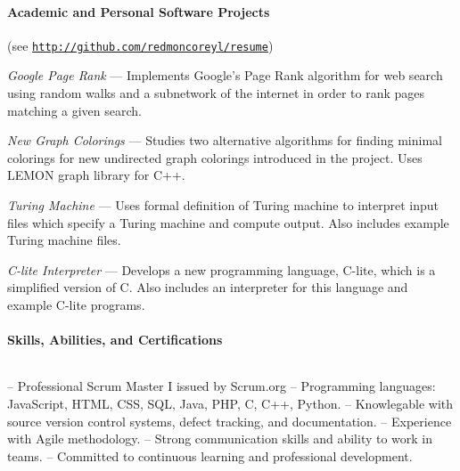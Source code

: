 \documentclass{article}
\begin{document}
  \paragraph{Academic and Personal Software Projects} \hfill (see \href{http://github.com/redmoncoreyl/resume}{\texttt{http://github.com/redmoncoreyl/resume}})%

  \hangindent=0.5in
  \textit{Google Page Rank} --- Implements Google's Page Rank algorithm
  for web search using random walks and a subnetwork of the internet in order to
  rank pages matching a given search.

  \hangindent=0.5in
	\textit{New Graph Colorings} --- Studies two alternative algorithms for
  finding minimal colorings for new undirected graph colorings introduced in the project. Uses LEMON
  graph library for C++.

  \hangindent=0.5in
	\textit{Turing Machine} --- Uses formal definition of Turing machine to
  interpret input files which specify a Turing machine and compute output. Also includes
  example Turing machine files.

  \hangindent=0.5in
	\textit{C-lite Interpreter} --- Develops a new programming language, C-lite, which
  is a simplified version of C. Also includes an interpreter for this language and
  example C-lite programs.

  \paragraph{Skills, Abilities, and Certifications} $ $

  \hangindent=0.4in
  -- Professional Scrum Master I issued by Scrum.org \newline
  -- Programming languages: JavaScript, HTML, CSS, SQL, Java, PHP, C, C++, Python. \newline
  -- Knowlegable with source version control systems, defect tracking, and documentation. \newline
  -- Experience with Agile methodology. \newline
  -- Strong communication skills and ability to work in teams. \newline
  -- Committed to continuous learning and professional development.
\end{document}
